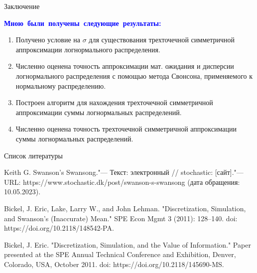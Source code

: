 \documentclass[ucs, notheorems, handout]{beamer}
\begin{document}
	\begin{frame}{Заключение}
		
		\textcolor{blue}{\hbox{\textbf{Мною были получены следующие результаты:}}}
		\begin{enumerate}
			\item Получено условие на $\sigma$ для существования трехточечной симметричной аппроксимации логнормального распределения.
			\item Численно оценена точность аппроксимации мат. ожидания и дисперсии логнормального распределения с помощью метода Свонсона, применяемого к нормальному распределению.
			\item Построен алгоритм для нахождения трехточечной симметричной аппроксимации суммы логнормальных распределений.
			\item Численно оценена точность трехточечной симметричной аппроксимации суммы логнормальных распределений.
		\end{enumerate}
		
		
	\end{frame}
	
	\begin{frame}{Список литературы}
		
		\begin{thebibliography}{1}
			 Keith G. Swanson's Swansong."--- Текст: электронный // stochastic: [сайт]."--- URL: https://www.stochastic.dk/post/swanson-s-swansong (дата обращения: 10.05.2023).
			
			 Bickel, J. Eric, Lake, Larry W., and John Lehman. "Discretization, Simulation, and Swanson's (Inaccurate) Mean." SPE Econ Mgmt 3 (2011): 128–140. doi: https://doi.org/10.2118/148542-PA.
			
			 Bickel, J. Eric. "Discretization, Simulation, and the Value of Information." Paper presented at the SPE Annual Technical Conference and Exhibition, Denver, Colorado, USA, October 2011. doi: https://doi.org/10.2118/145690-MS.
			
		\end{thebibliography}
		
		
	\end{frame}
	
	
\end{document}
